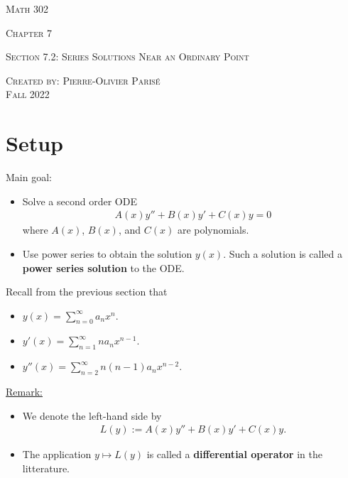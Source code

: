 \documentclass[12pt,a4paper]{article}
\begin{document}
\thispagestyle{empty}

\begin{center}
\vspace*{2.5cm}

{\Huge \textsc{Math 302}}

\vspace*{2cm}

{\LARGE \textsc{Chapter 7}} 

\vspace*{0.75cm}

\noindent\textsc{Section 7.2: Series Solutions Near an Ordinary Point}

\vspace*{0.75cm}

\tableofcontents

\vfill

\noindent \textsc{Created by: Pierre-Olivier Paris{\'e}} \\
\textsc{Fall 2022}
\end{center}

\newpage

\section{Setup}
Main goal:

	\begin{itemize}
	\item Solve a second order ODE
		\begin{align*}
		A(x) y'' + B(x) y' + C(x) y = 0
		\end{align*}
	where $A(x)$, $B(x)$, and $C(x)$ are polynomials.
	\item Use power series to obtain the solution $y(x)$. Such a solution is called a \textbf{power series solution} to the ODE.
	\end{itemize}
	
Recall from the previous section that
	\begin{itemize}
	\item $\displaystyle y(x) = \sum_{n = 0}^\infty a_n x^n$.
	\item $\displaystyle y'(x) = \sum_{n = 1}^\infty n a_n x^{n-1}$.
	\item $\displaystyle y''(x) = \sum_{n = 2}^\infty n (n - 1) a_n x^{n-2}$.
	\end{itemize}
	
\underline{Remark:}
	\begin{itemize}
	\item We denote the left-hand side by
		\begin{align*}
		L(y) := A(x) y'' + B(x) y' + C(x) y .
		\end{align*}
	\item The application $y \mapsto L(y)$ is called a \textbf{differential operator} in the litterature. 
	\end{itemize}
\end{document}
